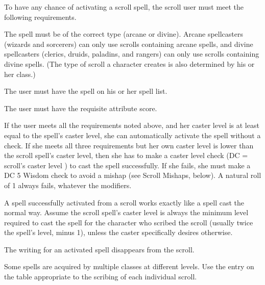 To have any chance of activating a scroll spell, the scroll user must meet the following requirements.
\begin{itemize*}
\item The spell must be of the correct type (arcane or divine). Arcane spellcasters (wizards and sorcerers) can only use scrolls containing arcane spells, and divine spellcasters (clerics, druids, paladins, and rangers) can only use scrolls containing divine spells. (The type of scroll a character creates is also determined by his or her class.)
\item The user must have the spell on his or her spell list.
\item The user must have the requisite attribute score.
\end{itemize*}

If the user meets all the requirements noted above, and her caster level is at least equal to the spell's caster level, she can automatically activate the spell without a check. If she meets all three requirements but her own caster level is lower than the scroll spell's caster level, then she has to make a caster level check (DC = scroll's caster level ) to cast the spell successfully. If she fails, she must make a DC 5 Wisdom check to avoid a mishap (see Scroll Mishaps, below). A natural roll of 1 always fails, whatever the modifiers.

 A spell successfully activated from a scroll works exactly like a spell cast the normal way. Assume the scroll spell's caster level is always the minimum level required to cast the spell for the character who scribed the scroll (usually twice the spell's level, minus 1), unless the caster specifically desires otherwise.

The writing for an activated spell disappears from the scroll.

 Some spells are acquired by multiple classes at different levels. Use the entry on the table appropriate to the scribing of each individual scroll.

